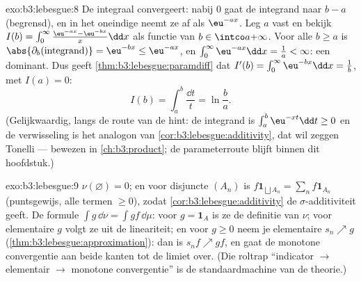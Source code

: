 \begin{solution}{exo:b3:lebesgue:8}
De integraal convergeert: nabij $0$ gaat de integrand naar $b - a$
(begrensd), en in het oneindige neemt ze af als $\eu^{-ax}$. Leg
$a$ vast en bekijk $I(b) = \int_0^\infty\frac{\eu^{-ax} -
\eu^{-bx}}x\dd x$ als functie van $b \in \intco a{+\infty}$. Voor
alle $b \geq a$ is $\abs{\partial_b(\text{integrand})} =
\eu^{-bx} \leq \eu^{-ax}$, en $\int_0^\infty\eu^{-ax}\dd x =
\frac1a < \infty$: een  dominant. Dus geeft
\cref{thm:b3:lebesgue:paramdiff} dat $I'(b) =
\int_0^\infty\eu^{-bx}\dd x = \frac1b$, met $I(a) = 0$:
\[
I(b) = \int_a^b\frac{\dd t}t = \ln\frac ba .
\]
(Gelijkwaardig, langs de route van de hint: de integrand is
$\int_a^b\eu^{-xt}\dd t \geq 0$ en de verwisseling is het 
analogon van \cref{cor:b3:lebesgue:additivity}, dat wil zeggen
Tonelli --- bewezen in \cref{ch:b3:product}; de parameterroute
blijft binnen dit hoofdstuk.)
\end{solution}

\begin{solution}{exo:b3:lebesgue:9}
$\nu(\varnothing) = 0$; en voor disjuncte $(A_n)$ is $f\mathbf
1_{\bigsqcup A_n} = \sum_nf\mathbf 1_{A_n}$ (puntsgewijs, alle
termen $\geq 0$), zodat \cref{cor:b3:lebesgue:additivity} de
$\sigma$-additiviteit geeft. De formule $\int g\,\dd\nu = \int
gf\,\dd\mu$: voor $g = \mathbf 1_A$ is ze de definitie van $\nu$;
voor elementaire $g$ volgt ze uit de lineariteit; en voor 
$g \geq 0$ neem je elementaire $s_n \nearrow g$
(\cref{thm:b3:lebesgue:approximation}): dan is $s_nf \nearrow gf$,
en gaat de monotone convergentie aan beide kanten tot de limiet
over. (Die roltrap ``indicator $\to$ elementair $\to$ monotone
convergentie'' is de standaardmachine van de theorie.)
\end{solution}


